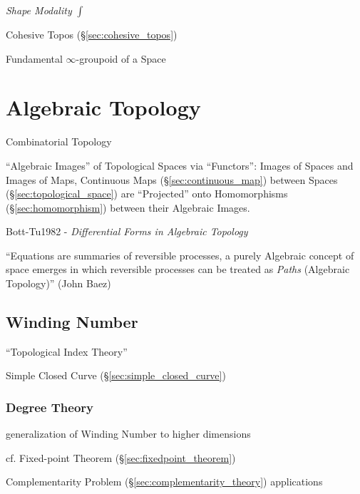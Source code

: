 \emph{Shape Modality} $\int$

Cohesive Topos (\S\ref{sec:cohesive_topos})

Fundamental $\infty$-groupoid of a Space



\section{Algebraic Topology}\label{sec:algebraic_topology}

Combinatorial Topology

``Algebraic Images'' of Topological Spaces via ``Functors'': Images of
Spaces and Images of Maps, Continuous Maps
(\S\ref{sec:continuous_map}) between Spaces
(\S\ref{sec:topological_space}) are ``Projected'' onto Homomorphisms
(\S\ref{sec:homomorphism}) between their Algebraic
Images.\cite{hatcher02}

Bott-Tu1982 - \emph{Differential Forms in Algebraic Topology}

``Equations are summaries of reversible processes, a purely Algebraic concept of
space emerges in which reversible processes can be treated as \emph{Paths}
(Algebraic Topology)''
(John Baez)



\subsection{Winding Number}\label{sec:winding_number}

``Topological Index Theory''

Simple Closed Curve (\S\ref{sec:simple_closed_curve})



\subsubsection{Degree Theory}\label{sec:degree_theory}

generalization of Winding Number to higher dimensions

cf. Fixed-point Theorem (\S\ref{sec:fixedpoint_theorem})

Complementarity Problem (\S\ref{sec:complementarity_theory}) applications



